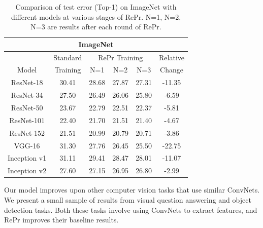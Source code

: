 \begin{table}[H]
\center
\begin{tabular}{cccccc}
\toprule
\multicolumn{6}{c}{\textbf{ImageNet}} \\
\midrule
      & Standard                             & \multicolumn{3}{c}{RePr Training}             &      Relative                       \\ \cline{3-5}
Model & Training & N=1 & N=2 & N=3 & Change \\ \midrule
\rowcolor[HTML]{EFEFEF} 
ResNet-18      & 30.41                       & 28.68        & 27.87        & {\color[HTML]{3166FF} 27.31} & -11.35                      \\
ResNet-34      & 27.50                       & 26.49        & 26.06        & {\color[HTML]{3166FF} 25.80} & -6.59                       \\
\rowcolor[HTML]{EFEFEF} 
ResNet-50      & 23.67                       & 22.79        & 22.51        & {\color[HTML]{3166FF} 22.37} & -5.81                       \\
ResNet-101     & 22.40                       & 21.70        & 21.51        & {\color[HTML]{3166FF} 21.40} & -4.67                       \\
\rowcolor[HTML]{EFEFEF} 
ResNet-152     & 21.51                       & 20.99        & 20.79        & {\color[HTML]{3166FF} 20.71} & -3.86                       \\
VGG-16         & 31.30                       & 27.76        & 26.45        & {\color[HTML]{3166FF} 25.50} & -22.75                      \\
\rowcolor[HTML]{EFEFEF} 
Inception v1   & 31.11                       & 29.41        & 28.47        & {\color[HTML]{3166FF} 28.01} & -11.07                      \\
Inception v2   & 27.60                       & 27.15        & 26.95        & {\color[HTML]{3166FF} 26.80} & -2.99                       \\ \bottomrule
\end{tabular}
   \caption{Comparison of test error (Top-1) on ImageNet with different models at various stages of RePr. N=1, N=2, N=3 are results after each round of RePr.}
   \label{tbl:imagenet}
\end{table}

Our model improves upon other computer vision tasks that use similar ConvNets. We present a small sample of results from visual question answering and object detection tasks.
Both these tasks involve using ConvNets to extract features, and RePr improves their baseline results.

